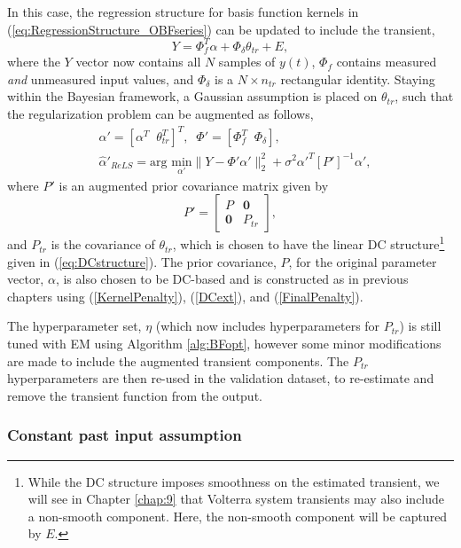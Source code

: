 In this case, the regression structure for basis function kernels in (\ref{eq:RegressionStructure_OBFseries}) can be updated to include the transient,
\begin{equation}
Y = \Phi_f^T \alpha + \Phi_{\delta} \theta_{tr} + E,
\end{equation}
where the $Y$ vector now contains all $N$ samples of $y(t)$, $\Phi_f$ contains measured \emph{and} unmeasured input values, and $\Phi_{\delta}$ is a $N \times n_{tr}$ rectangular identity. Staying within the Bayesian framework, a Gaussian assumption is placed on $\theta_{tr}$, such that the regularization problem can be augmented as follows,
\begin{align}
&\alpha' = [\alpha^T \; \; \theta_{tr}^T]^T, \; \; \Phi' = [\Phi_f^T \; \; \Phi_{\delta}], \nonumber \\
&\hat{\alpha}'_{ReLS} = \text{arg } \underset{\alpha'}{\text{min}} \|Y - \Phi' \alpha' \|^2_2 + \sigma^2 \alpha'^T [P']^{-1} \alpha',
\end{align}
where $P'$ is an augmented prior covariance matrix given by
$$P' = \begin{bmatrix}
       P &  \mathbf{0} \\
        \mathbf{0}  & P_{tr}
     \end{bmatrix},$$
and $P_{tr}$ is the covariance of $\theta_{tr}$, which is chosen to have the linear DC structure\footnote{While the DC structure imposes smoothness on the estimated transient, we will see in Chapter \ref{chap:9} that Volterra system transients may also include a non-smooth component. Here, the non-smooth component will be captured by $E$.} given in (\ref{eq:DCstructure}). The prior covariance, $P$, for the original parameter vector, $\alpha$, is also chosen to be DC-based and is constructed as in previous chapters using (\ref{KernelPenalty}), (\ref{DCext}), and (\ref{FinalPenalty}).

The hyperparameter set, $\eta$ (which now includes hyperparameters for $P_{tr}$) is still tuned with EM using Algorithm \ref{alg:BFopt}, however some minor modifications are made to include the augmented transient components. The $P_{tr}$ hyperparameters are then re-used in the validation dataset, to re-estimate and remove the transient function from the output.

\subsubsection{Constant past input assumption}
\label{sec:ConstInput_tanks}


